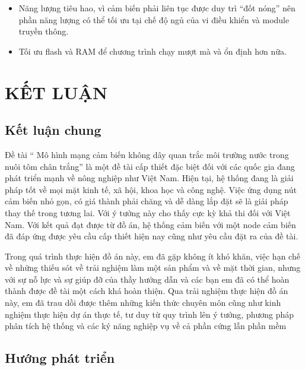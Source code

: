 \documentclass{article} %
\begin{document}
	\begin{itemize}
		\item Năng lượng tiêu hao, vì cảm biến phải liên tục được duy trì “đốt nóng” nên phần năng lượng có thể tối ưu tại chế độ ngủ của vi điều khiển và module truyền thông.
		\item Tối ưu flash và RAM để chương trình chạy mượt mà và ổn định hơn nữa.
	\end{itemize}
	
	
	\newpage
	\section*{KẾT LUẬN}
	
	\subsection*{Kết luận chung}
	
	Đề tài “ Mô hình mạng cảm biến không dây quan trắc môi trường nước trong nuôi tôm chân trắng” là một đề tài cấp thiết đặc biệt đối với các quốc gia đang phát triển mạnh về nông nghiệp như Việt Nam. Hiện tại, hệ thống đang là giải pháp tốt về mọi mặt kinh tế, xã hội, khoa học và công nghệ. Việc ứng dụng nút cảm biến nhỏ gọn, có giá thành phải chăng và dễ dàng lắp đặt sẽ là giải pháp thay thế trong tương lai. Với ý tưởng này cho thấy cực kỳ khả thi đối với Việt Nam. Với kết quả đạt được từ đồ án, hệ thống cảm biến với một node cảm biến đã đáp ứng được yêu cầu cấp thiết hiện nay cũng như yêu cầu đặt ra của đề tài.
	
	Trong quá trình thực hiện đồ án này, em đã gặp không ít khó khăn, việc hạn chế về những thiếu sót về trải nghiệm làm một sản phẩm và về mặt thời gian, nhưng với sự nỗ lực và sự giúp đỡ của thầy hướng dẫn và các bạn em đã có thể hoàn thành được đề tài một cách khá hoàn thiện. Qua trải nghiệm thực hiện đồ án này, em đã trau dồi được thêm những kiến thức chuyên môn cũng như kinh nghiệm thực hiện dự án thực tế, tư duy từ quy trình lên ý tưởng, phương pháp phân tích hệ thống và các ký năng nghiệp  vụ về cả phần cứng lẫn phần mềm
	
	\subsection*{Hướng phát triển}
	
\end{document}

